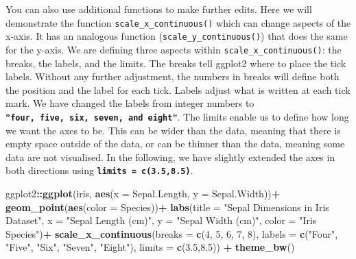 \documentclass[
]{book}
\newenvironment{Shaded}{\begin{snugshade}}{\end{snugshade}}
\newcommand{\AttributeTok}[1]{\textcolor[rgb]{0.13,0.29,0.53}{#1}}
\newcommand{\DecValTok}[1]{\textcolor[rgb]{0.00,0.00,0.81}{#1}}
\newcommand{\FloatTok}[1]{\textcolor[rgb]{0.00,0.00,0.81}{#1}}
\newcommand{\FunctionTok}[1]{\textcolor[rgb]{0.13,0.29,0.53}{\textbf{#1}}}
\newcommand{\NormalTok}[1]{#1}
\newcommand{\SpecialCharTok}[1]{\textcolor[rgb]{0.81,0.36,0.00}{\textbf{#1}}}
\newcommand{\StringTok}[1]{\textcolor[rgb]{0.31,0.60,0.02}{#1}}
\begin{document}
You can also use additional functions to make further edits. Here we will demonstrate the function \texttt{scale\_x\_continuous()} which can change aspects of the x-axis. It has an analogous function (\texttt{scale\_y\_continuous()}) that does the same for the y-axis. We are defining three aspects within \texttt{scale\_x\_continuous()}: the breaks, the labels, and the limits. The breaks tell ggplot2 where to place the tick labels. Without any further adjustment, the numbers in breaks will define both the position and the label for each tick. Labels adjust what is written at each tick mark. We have changed the labels from integer numbers to \textbf{\texttt{"four,\ five,\ six,\ seven,\ and\ eight"}}. The limits enable us to define how long we want the axes to be. This can be wider than the data, meaning that there is empty space outside of the data, or can be thinner than the data, meaning some data are not visualised. In the following, we have slightly extended the axes in both directions using \textbf{\texttt{limits\ =\ c(3.5,8.5)}}.

\begin{Shaded}
\begin{Highlighting}[]
\NormalTok{ggplot2}\SpecialCharTok{::}\FunctionTok{ggplot}\NormalTok{(iris, }\FunctionTok{aes}\NormalTok{(}\AttributeTok{x =}\NormalTok{ Sepal.Length, }\AttributeTok{y =}\NormalTok{ Sepal.Width))}\SpecialCharTok{+}
  \FunctionTok{geom\_point}\NormalTok{(}\FunctionTok{aes}\NormalTok{(}\AttributeTok{color =}\NormalTok{ Species))}\SpecialCharTok{+}
  \FunctionTok{labs}\NormalTok{(}\AttributeTok{title =} \StringTok{"Sepal Dimensions in Iris Dataset"}\NormalTok{,}
       \AttributeTok{x =} \StringTok{"Sepal Length (cm)"}\NormalTok{,}
       \AttributeTok{y =} \StringTok{"Sepal Width (cm)"}\NormalTok{, }
       \AttributeTok{color =} \StringTok{"Iris Species"}\NormalTok{)}\SpecialCharTok{+}
  \FunctionTok{scale\_x\_continuous}\NormalTok{(}\AttributeTok{breaks =} \FunctionTok{c}\NormalTok{(}\DecValTok{4}\NormalTok{, }\DecValTok{5}\NormalTok{, }\DecValTok{6}\NormalTok{, }\DecValTok{7}\NormalTok{, }\DecValTok{8}\NormalTok{),}
                     \AttributeTok{labels =} \FunctionTok{c}\NormalTok{(}\StringTok{"Four"}\NormalTok{, }\StringTok{"Five"}\NormalTok{, }\StringTok{"Six"}\NormalTok{, }\StringTok{"Seven"}\NormalTok{, }\StringTok{"Eight"}\NormalTok{),}
                     \AttributeTok{limits =} \FunctionTok{c}\NormalTok{(}\FloatTok{3.5}\NormalTok{,}\FloatTok{8.5}\NormalTok{)) }\SpecialCharTok{+} 
  \FunctionTok{theme\_bw}\NormalTok{()}
\end{Highlighting}
\end{Shaded}
\end{document}

